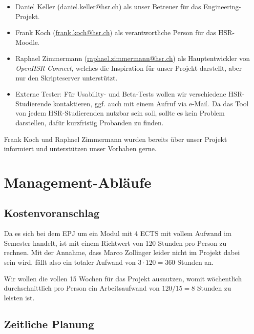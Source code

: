 \documentclass[a4paper]{article}
\let\oldsection\section
\renewcommand\section{\clearpage\oldsection}
\begin{document}

\begin{itemize}
  \item Daniel Keller (\url{daniel.keller@hsr.ch}) als unser Betreuer für das Engineering-Projekt.
  \item Frank Koch (\url{frank.koch@hsr.ch}) als verantwortliche Person für das HSR-Moodle.
  \item Raphael Zimmermann (\url{raphael.zimmermann@hsr.ch}) als Hauptentwickler
    von \emph{OpenHSR Connect}, welches die
    Inspiration für unser Projekt darstellt, aber nur den Skripteserver
    unterstützt.
  \item Externe Tester: Für Usability- und Beta-Tests wollen wir verschiedene
    HSR-Studierende kontaktieren, ggf. auch mit einem Aufruf via e-Mail. Da das
    Tool von jedem HSR-Studierenden nutzbar sein soll, sollte es kein Problem
    darstellen, dafür kurzfristig Probanden zu finden.
\end{itemize}

Frank Koch und Raphael Zimmermann wurden bereits über unser Projekt informiert
und unterstützen unser Vorhaben gerne.

\section{Management-Abläufe}
\subsection{Kostenvoranschlag}

Da es sich bei dem EPJ um ein Modul mit 4 ECTS mit vollem Aufwand im Semester handelt, ist mit einem Richtwert von 120 Stunden pro Person zu rechnen.
Mit der Annahme, dass Marco Zollinger leider nicht im Projekt dabei sein wird,
fällt also ein totaler Aufwand von $3 \cdot 120 = 360$ Stunden an.

Wir wollen die vollen 15 Wochen für das Projekt ausnutzen, womit wöchentlich
durchschnittlich pro Person ein Arbeitsaufwand von $120 / 15 = 8$ Stunden zu
leisten ist.


\subsection{Zeitliche Planung}
\end{document}
